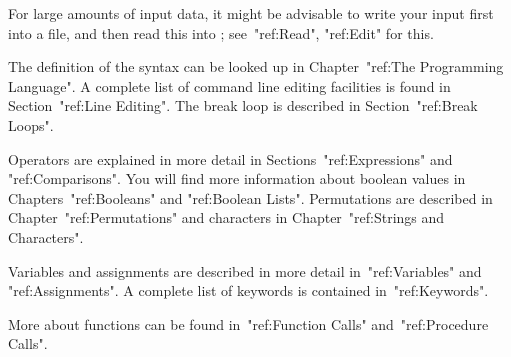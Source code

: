 
For large amounts of input data, it might be advisable to write your
input first into a file, and then read this into {\GAP};
see~"ref:Read", "ref:Edit" for this.

The definition of the {\GAP} syntax can be looked up in
Chapter~"ref:The Programming Language".
A complete list of command line editing facilities is found
in Section~"ref:Line Editing".
The break loop is described in Section~"ref:Break Loops".

Operators are explained in more detail in Sections~"ref:Expressions" and
"ref:Comparisons".
You will find more information about boolean values in
Chapters~"ref:Booleans" and "ref:Boolean Lists".
Permutations are described in Chapter~"ref:Permutations" and characters
in Chapter~"ref:Strings and Characters".

Variables and assignments are described in more detail in~"ref:Variables"
and "ref:Assignments".
A complete list of keywords is contained in~"ref:Keywords".

More about functions can be found in~"ref:Function Calls"
and~"ref:Procedure Calls".


